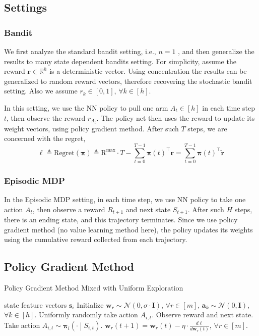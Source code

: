 \documentclass{article}
\def\rva{{\mathbf{a}}}
\def\rvr{{\mathbf{r}}}
\def\rvs{{\mathbf{s}}}
\def\rvw{{\mathbf{w}}}
\def\rvtilder{{\tilde{\mathbf{r}}}}
\def\r{{\text{R}}}
\def\regret{{\text{Regret}}}
\def\rvpi{{\boldsymbol{\pi}}}
\def\rmI{{\mathbf{I}}}
\def\sR{{\mathbb{R}}}
\def\gN{{\mathcal{N}}}
\begin{document}
\subsection{Settings}

\subsubsection{Bandit}

We first analyze the standard bandit setting, i.e., $n = 1$ , and then generalize the results to many state dependent bandits setting. For simplicity, assume the reward $\rvr \in \sR^h$ is a deterministic vector. Using concentration the results can be generalized to random reward vectors, therefore recovering the stochastic bandit setting. Also we assume $r_k \in [0, 1]$, $\forall k \in [h]$.

In this setting, we use the NN policy to pull one arm $A_t \in [h]$ in each time step $t$, then observe the reward $r_{A_t}$. The policy net then uses the reward to update its weight vectors, using policy gradient method. After such $T$ steps, we are concerned with the regret,
\begin{equation*}
    \ell \triangleq \regret(\rvpi) \triangleq \r^{\max} \cdot T - \sum\limits_{t=0}^{T-1}{ \rvpi(t)^\top \rvr } = \sum\limits_{t=0}^{T-1}{ \rvpi(t)^\top \rvtilder }
\end{equation*}

\subsubsection{Episodic MDP}

In the Episodic MDP setting, in each time step, we use NN policy to take one action $A_t$, then observe a reward $R_{t+1}$ and next state $S_{t+1}$. After such $H$ steps, there is an ending state, and this trajectory terminates. Since we use policy gradient method (no value learning method here), the policy updates its weights using the cumulative reward collected from each trajectory. 


\subsection{Policy Gradient Method}

\begin{algorithm}[h]
   \caption{Policy Gradient Method Mixed with Uniform Exploration}
   \label{alg:example}
\begin{algorithmic}
    state feature vectors $\rvs_i$
   \STATE Initialize $\rvw_r \sim \gN\left( 0, \sigma \cdot \rmI \right)$, $\forall r \in [m]$, $\rva_k \sim \gN(0, \rmI)$, $\forall k \in [h]$.
   \STATE Uniformly randomly take action $A_{i,t}$. 
   \STATE Observe reward and next state.
   \ELSE
   \STATE Take action $A_{i,t} \sim \rvpi_{i}\left(\cdot \middle| S_{i,t} \right)$. 
   \ENDIF
   \STATE $\rvw_r(t+1) = \rvw_r(t) - \eta \cdot \frac{d\ell}{d \rvw_r(t)}$, $\forall r \in [m]$.
   \ENDFOR
\end{algorithmic}
\end{algorithm}
\end{document}
